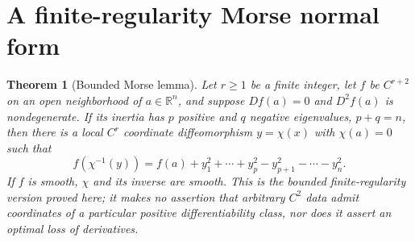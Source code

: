 \documentclass[11pt,oneside,openany]{book}
\newtheorem{theorem}{Theorem}[chapter]
\theoremstyle{definition}
\theoremstyle{remark}
\newcommand{\R}{\mathbb R}
\newcommand{\family}[1]{}
\begin{document}
\section{A finite-regularity Morse normal form}
\family{K04.05.11}

\begin{theorem}[Bounded Morse lemma]\label{d04:05:morse}
Let $r\geq1$ be a finite integer, let $f$ be $C^{r+2}$ on an open
neighborhood of $a\in\R^n$, and suppose $Df(a)=0$ and $D^2f(a)$ is
nondegenerate. If its inertia has $p$ positive and $q$ negative eigenvalues,
$p+q=n$, then there is a local $C^r$ coordinate diffeomorphism
$y=\chi(x)$ with $\chi(a)=0$ such that
\[
 f(\chi^{-1}(y))=f(a)+y_1^2+\cdots+y_p^2
                                  -y_{p+1}^2-\cdots-y_n^2.
\]
If $f$ is smooth, $\chi$ and its inverse are smooth. This is the bounded
finite-regularity version proved here; it makes no assertion that arbitrary
$C^2$ data admit coordinates of a particular positive differentiability
class, nor does it assert an optimal loss of derivatives.
\end{theorem}
\end{document}
